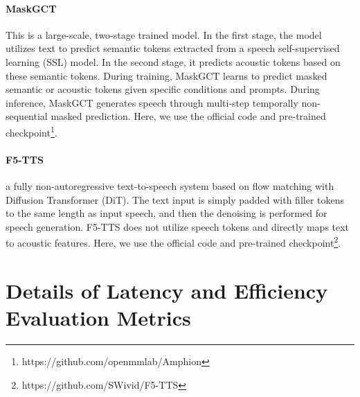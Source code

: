\paragraph{MaskGCT}\cite{maskgct}  This is a large-scale, two-stage trained model. In the first stage, the model utilizes text to predict semantic tokens extracted from a speech self-supervised learning (SSL) model. In the second stage, it predicts acoustic tokens based on these semantic tokens. During training, MaskGCT learns to predict masked semantic or acoustic tokens given specific conditions and prompts. During inference, MaskGCT generates speech through multi-step temporally non-sequential masked prediction. Here, we use the official code and pre-trained checkpoint\footnote{https://github.com/openmmlab/Amphion}.

\paragraph{F5-TTS}\cite{F5tts} a fully non-autoregressive text-to-speech system
based on flow matching with Diffusion Transformer (DiT). The
text input is simply padded with filler tokens to the same length as input speech,
and then the denoising is performed for speech generation. F5-TTS does not utilize speech tokens and directly maps text to acoustic features. Here, we use the official code and pre-trained checkpoint\footnote{https://github.com/SWivid/F5-TTS}.






\section{Details of Latency and Efficiency Evaluation Metrics}
\label{evaluation metrics}

